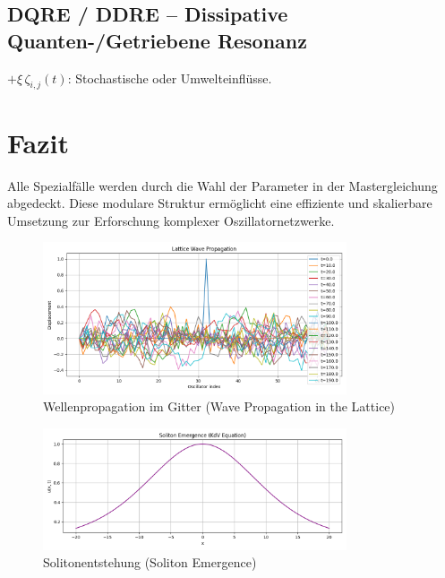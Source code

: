 \documentclass[12pt]{article}
\begin{document}
\subsection*{DQRE / DDRE -- Dissipative Quanten-/Getriebene Resonanz}
$+ \xi\, \zeta_{i,j}(t)$: Stochastische oder Umwelteinflüsse.

\section*{Fazit}
Alle Spezialfälle werden durch die Wahl der Parameter in der Mastergleichung abgedeckt. Diese modulare Struktur ermöglicht eine effiziente und skalierbare Umsetzung zur Erforschung komplexer Oszillatornetzwerke.

\begin{figure}[H]
\centering
\includegraphics[width=0.8\textwidth]{lattice_wave_propagation.png}
\caption{Wellenpropagation im Gitter (Wave Propagation in the Lattice)}
\end{figure}

\begin{figure}[H]
\centering
\includegraphics[width=0.8\textwidth]{soliton_emergence.png}
\caption{Solitonentstehung (Soliton Emergence)}
\end{figure}
\end{document}
